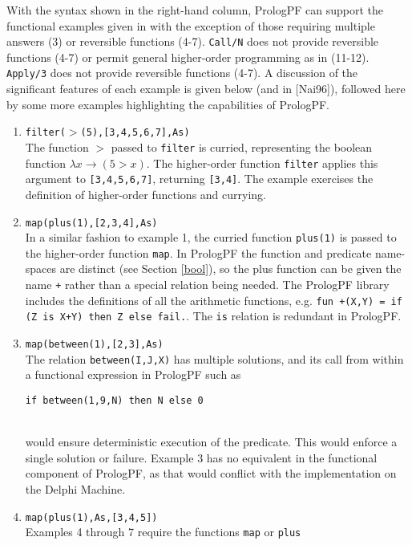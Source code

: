 With the syntax shown in the right-hand column, PrologPF can support the 
functional examples given in \cite{Nai96} with the exception of those requiring
multiple answers (3) or reversible functions (4-7).  \texttt{Call/N} does not
provide reversible functions (4-7) or permit general higher-order programming
as in (11-12).  \texttt{Apply/3} does not provide reversible functions (4-7).
A discussion of the significant features of each example is given below
(and in [Nai96]), followed here
by some more examples highlighting the capabilities of PrologPF.

\begin{enumerate}
\item{\texttt{filter($>$(5),[3,4,5,6,7],As)}\\
  The function $>$ passed to \texttt{filter} is curried, representing the 
  boolean function $\lambda x \rightarrow (5 > x)$.  The higher-order function
  \texttt{filter} applies this argument to \texttt{[3,4,5,6,7]}, returning
  \texttt{[3,4]}.  The example exercises the definition of higher-order functions
  and currying.}
\item{\texttt{map(plus(1),[2,3,4],As)}\\
  In a similar fashion to example 1, the curried function \texttt{plus(1)} is
  passed to the higher-order function \texttt{map}.  In PrologPF the function and
  predicate name-spaces are distinct (see Section \ref{bool}), so the plus function
  can be given the name \texttt{+} rather than a special relation being needed.  The
  PrologPF library includes the definitions of all the arithmetic functions, e.g.
  \mbox{\texttt{fun +(X,Y) = if (Z is X+Y) then Z else fail.}}.  The \texttt{is}
  relation is redundant in PrologPF.}
\item{\texttt{map(between(1),[2,3],As)}\\
  The relation \texttt{between(I,J,X)} has multiple solutions, and its call
  from within a functional expression in PrologPF such as\\ 
  \centerline{\mbox{\texttt{if between(1,9,N) then N else 0}}}\\
  would ensure deterministic execution of
  the predicate.  This would enforce a single solution or failure.  Example 3 has no
  equivalent in the functional component of PrologPF, as that would conflict with
  the implementation on the Delphi Machine.}
\item{\texttt{map(plus(1),As,[3,4,5])}\\
  Examples 4 through 7 require the functions \texttt{map} or \texttt{plus}
}
\end{enumerate}
